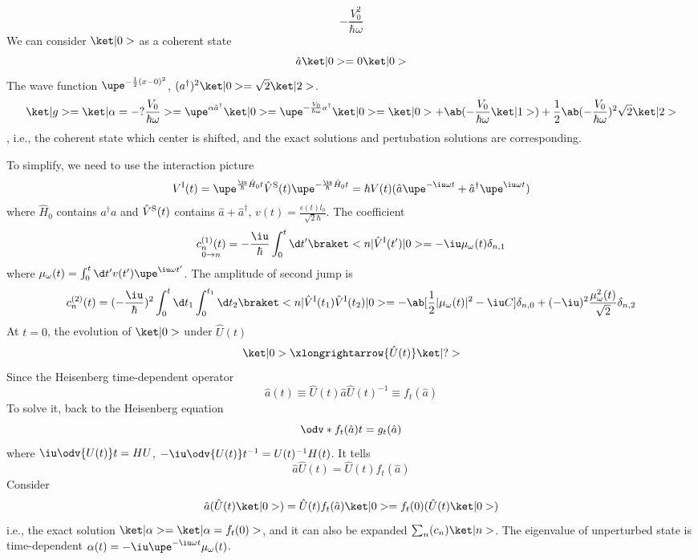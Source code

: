 \begin{solution}[By Li Jian]
\begin{enumext}
\[    - \frac{V_0^2}{\hbar\omega}
    \]
    We can consider $\ket|0>$ as a coherent state
    \[
      \hat a\ket|0> = 0\ket|0>
    \]
    The wave function $\upe^{-\frac12(x-0)^2}$,
    $(a^\dagger)^2 \ket|0> = \sqrt2\ket|2>$.
    \[
      \ket|g> = \ket|\alpha = -?\frac{V_0}{\hbar\omega}>
    = \upe^{\alpha\hat a^\dagger} \ket|0>
    = \upe^{-\frac{V_0}{\hbar\omega}a^\dagger} \ket|0>
    = \ket|0> + \ab(-\frac{V_0}{\hbar\omega}\ket|1>)
    + \frac12\ab(-\frac{V_0}{\hbar\omega})^2\sqrt2\ket|2>
    \], i.e., the coherent
    state which center is shifted, and the exact solutions and pertubation
    solutions are corresponding.
    \item To simplify, we need to use the interaction picture
    \[
      V^\text I(t) = \upe^{\frac\iu\hbar\hat H_0t} \hat V^\text S(t)
                     \upe^{-\frac\iu\hbar\hat H_0t}
    = \hbar V(t) (\hat a\upe^{-\iu\omega t} + \hat a^\dagger \upe^{\iu\omega t})
    \]
    where $\hat H_0$ contains $a^\dagger a$ and $\hat V^\text S(t)$
    contains $\hat a + \hat a^\dagger$,
    $v(t) = \frac{\epsilon(t)l_0}{\sqrt2\hbar}$. The coefficient
    \[
      \underset{0\to n}{c_n^{(1)}(t)}
    = -\frac\iu\hbar \int_0^t \d t' \braket<n|\hat V^\text I(t')|0>
    = -\iu\mu_\omega(t) \delta_{n,1}
    \]
    where $\mu_\omega(t) = \int_0^t \d t' v(t') \upe^{\iu\omega t'}$.
    The amplitude of second jump is
    \[
      c_n^{(2)}(t) = (-\frac\iu\hbar)^2 \int_0^t \d t_1 \int_0^{t_1} \d t_2
        \braket<n|\hat V^\text I(t_1)\hat V^\text I(t_2)|0>
    = -\ab[\frac12|\mu_\omega(t)|^2 - \iu C] \delta_{n,0}
    + (-\iu)^2 \frac{\mu_\omega^2(t)}{\sqrt2} \delta_{n,2}
    \]
    At $t = 0$, the evolution of $\ket|0>$ under $\hat U(t)$
    \[
      \ket|0> \xlongrightarrow{\hat U(t)} \ket|?>
    \]
    Since the Heisenberg time-dependent operator
    \[
      \hat a(t) \equiv \hat U(t) \hat a \hat U(t)^{-1} \equiv f_t(\hat a)
    \]
    To solve it, back to the Heisenberg equation
    \[
      \odv*{f_t(\hat a)}t = g_t(\hat a)
    \]
    where $\iu\odv{U(t)}t = HU$, $-\iu\odv{U(t)}t^{-1} = U(t)^{-1}H(t)$.
    It tells
    \[
      \hat a\hat U(t) = \hat U(t) f_t(\hat a)
    \]
    Consider
    \[
      \hat a(\hat U(t)\ket|0>) = \hat U(t) f_t(\hat a) \ket|0>
    = f_t(0) (\hat U(t) \ket|0>)
    \]
    i.e., the exact solution $\ket|\alpha> = \ket|\alpha = f_t(0)>$, and it can
    also be expanded $\sum_n(c_n) \ket|n>$. The eigenvalue of unperturbed state
    is time-dependent $\alpha(t) = -\iu\upe^{-\iu\omega t} \mu_\omega(t)$.
  \end{enumext}
\end{solution}
